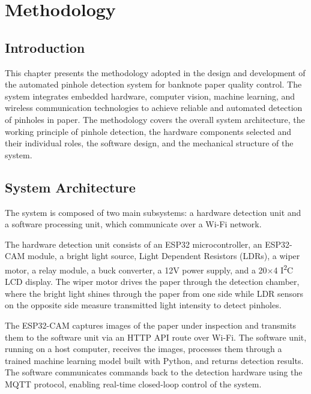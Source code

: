 
\chapter{Methodology}

\section{Introduction}

This chapter presents the methodology adopted in the design and development of the automated pinhole detection system for banknote paper quality control. The system integrates embedded hardware, computer vision, machine learning, and wireless communication technologies to achieve reliable and automated detection of pinholes in paper. The methodology covers the overall system architecture, the working principle of pinhole detection, the hardware components selected and their individual roles, the software design, and the mechanical structure of the system.

\section{System Architecture}

The system is composed of two main subsystems: a hardware detection unit and a software processing unit, which communicate over a Wi-Fi network.

The hardware detection unit consists of an ESP32 microcontroller, an ESP32-CAM module, a bright light source, Light Dependent Resistors (LDRs), a wiper motor, a relay module, a buck converter, a 12V power supply, and a 20$\times$4 I\textsuperscript{2}C LCD display. The wiper motor drives the paper through the detection chamber, where the bright light shines through the paper from one side while LDR sensors on the opposite side measure transmitted light intensity to detect pinholes.

The ESP32-CAM captures images of the paper under inspection and transmits them to the software unit via an HTTP API route over Wi-Fi. The software unit, running on a host computer, receives the images, processes them through a trained machine learning model built with Python, and returns detection results. The software communicates commands back to the detection hardware using the MQTT protocol, enabling real-time closed-loop control of the system.

